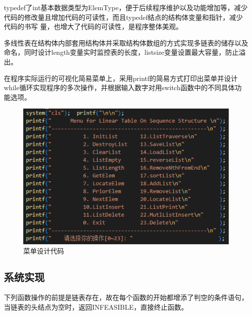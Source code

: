\documentclass[supercite]{Experimental_Report}
\theoremstyle{definition}
\begin{document}
typedef了int基本数据类型为ElemType，便于后续程序维护以及功能增加等，减少代码的修改量且增加代码的可读性，而且typedef结点的结构体变量和指针，减少代码的书写
量，也增大了代码的可读性，是程序整体美观。

多线性表在结构体内部套用结构体并采取结构体数组的方式实现多链表的储存以及命名，同时设计length变量实时监控表的长度，listsize变量设置最大容量，防止溢出。

在程序实际运行的可视化简易菜单上，采用printf的简易方式打印出菜单并设计while循环实现程序的多次操作，并根据输入数字对用switch函数中的不同具体功能选项。

\begin{figure}[htb] %
	\begin{center}
		\includegraphics[scale=0.60]{images/1.png}
		\caption{菜单设计代码}
		\label{fig1-1}
	\end{center}
\end{figure}


\subsection{系统实现}
下列函数操作的前提是链表存在，故在每个函数的开始都增添了判空的条件语句，当链表的头结点为空时，返回INFEASIBLE，直接终止函数。
\end{document}
